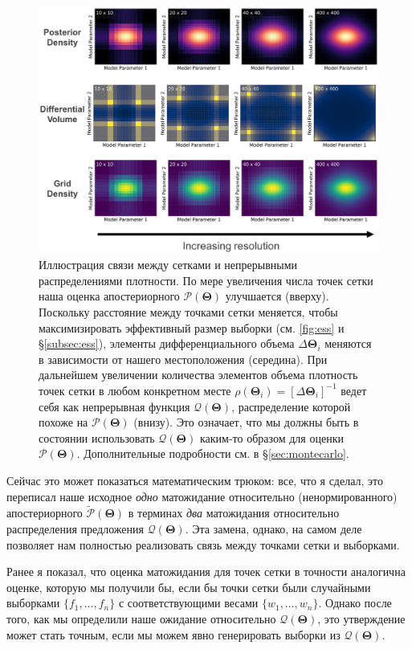 \documentclass[12pt, titlepage]{article}
\newcommand{\params}{\ensuremath{\boldsymbol\Theta}}
\newcommand{\posterior}{\ensuremath{\mathcal{P}}}
\newcommand{\proposal}{\ensuremath{\mathcal{Q}}}
\begin{document}
\begin{figure}
\begin{center}
\includegraphics[width=\textwidth]{figures/fig6.png}
\end{center}
\caption{Иллюстрация связи между сетками и непрерывными распределениями плотности. По мере увеличения числа точек сетки наша оценка апостериорного $\posterior(\params)$ улучшается (вверху). Поскольку расстояние между точками сетки меняется, чтобы максимизировать эффективный размер выборки (см. \autoref{fig:ess} и \S\ref{subsec:ess}), элементы дифференциального объема $\Delta \params_i$ меняются в зависимости от нашего местоположения (середина). При дальнейшем увеличении количества элементов объема плотность точек сетки в любом конкретном месте $\rho(\params_i) = [\Delta \params_i]^{-1}$ ведет себя как непрерывная функция $\proposal(\params)$, распределение которой похоже на $\posterior(\params)$ (внизу). Это означает, что мы должны быть в состоянии использовать $\proposal(\params)$ каким-то образом для оценки $\posterior(\params)$. Дополнительные подробности см. в \S\ref{sec:montecarlo}.
}\label{fig:density}
\end{figure}

Сейчас это может показаться математическим трюком: все, что я сделал, это переписал наше исходное \textit{одно} матожидание относительно (ненормированного) апостериорного $\tilde{\posterior}(\params)$ в терминах \textit{два} матожидания относительно распределения предложения $\proposal(\params)$. Эта замена, однако, на самом деле позволяет нам полностью реализовать связь между точками сетки и выборками.

Ранее я показал, что оценка матожидания для точек сетки в точности аналогична оценке, которую мы получили бы, если бы точки сетки были случайными выборками $\{ f_1, \dots, f_n \}$ с соответствующими весами $\{ w_1, \dots, w_n \}$. Однако после того, как мы определили наше ожидание относительно $\proposal(\params)$, это утверждение может стать точным, если мы можем явно генерировать выборки из $\proposal(\params)$.
\end{document}
